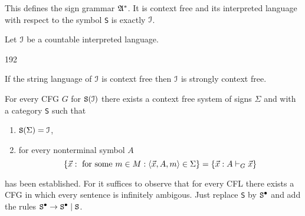 This defines the sign grammar $\mathfrak{A}^{\ast}$. It is context free 
and its interpreted language with respect to the symbol {\tt S} is 
exactly $\mathcal{I}$.
\begin{thm}
\label{thm:schwachstark}
Let $\mathcal{I}$ be a countable interpreted language.
\begin{dingautolist}{192}
\item
If the string language of $\mathcal{I}$ is context free then $\mathcal{I}$ is
strongly context free.
\item
For every CFG $G$ for $\mbox{\tt S}(\mathcal{I})$ there exists a
context free system of signs $\Sigma$ and with a category 
{\tt S} such that
\begin{enumerate}
\item $\mbox{\tt S}(\Sigma) = \mathcal{I}$,
\item for every nonterminal symbol $A$ 
	$$\{\vec{x} : \mbox{ for some } 
    m \in M: \langle \vec{x}, A, m\rangle \in \Sigma\} = \{\vec{x} :
    A \vdash_G \vec{x}\}$$
\end{enumerate}
\end{dingautolist}
\end{thm}
\proofbeg
{} has been established. For  it suffices to 
observe that for every CFL there exists a CFG in which every 
sentence is infinitely ambigous. Just replace {\tt S} by 
$\mbox{\tt S}^{\bullet}$ and add the rules 
$\mbox{\tt S}^{\bullet} \rightarrow \mbox{\tt S}^{\bullet} 
\mid \mbox{\tt S}$.
\proofend

